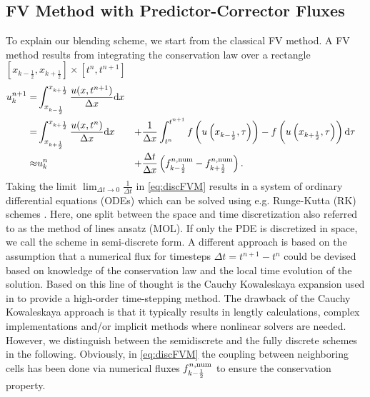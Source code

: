 \subsection{FV Method with Predictor-Corrector Fluxes}
To explain our blending scheme, we start from the classical FV method.  
A FV method results from integrating the conservation law over a rectangle $\left[x_{k-\frac 1 2}, x_{k + \frac 1 2}\right] \times \left[t^n, t^{n+1}\right]$
\begin{equation} \label{eq:discFVM}
\begin{aligned}
	 u^{n+1}_k =& \int_{x_{k-\frac 1 2}}^{x_{k+\frac 1 2}} \frac{u(x, t^{n+1})}{\Delta x} \mathrm{d} x \\=& \int_{x_{k+\frac 1 2}}^{x_{k+\frac 1 2}} \frac{u(x, t^n)}{\Delta x} \mathrm{d} x &+& \frac{1}{\Delta x}\int_{t^n}^{t^{n+1}} f\left(u\left(x_{k-\frac 1 2}, \tau\right)\right) - f\left(u\left(x_{k+\frac 1 2}, \tau \right)\right)  \mathrm{d} \tau \\
	  \approx&  u^{n}_k &+& \frac{\Delta t}{\Delta x} \left(f^{n, \mathrm{num}}_{k-\frac 1 2} - {f^{n, \mathrm{num}}_{k+\frac 1 2}}\right).
	 \end{aligned}
\end{equation}
Taking the limit $\lim_{\Delta t \to 0} \frac{1}{\Delta t}$ in \eqref{eq:discFVM} results in a system of ordinary differential equations (ODEs) which can be solved 
using e.g. Runge-Kutta (RK) schemes \cite{SO1988, SO1989}.  Here, one split between the space and time discretization also referred to as the method of lines ansatz (MOL). If only the PDE is discretized in space, we call the scheme in semi-discrete form.  
 A different approach is based on the assumption that a numerical flux for timesteps $\Delta t=t^{n+1}-t^n$ could be devised based on knowledge of the conservation law and the local time evolution of the solution. 
Based on this line of thought is the Cauchy Kowaleskaya expansion used in \cite{ENOIII} to provide a high-order time-stepping method.  
The drawback of the Cauchy Kowaleskaya approach is that it typically results in lengtly calculations, complex implementations and/or implicit methods where nonlinear solvers are needed. However, we distinguish between the semidiscrete and the fully discrete schemes in the following. 
Obviously, in  \eqref{eq:discFVM} the coupling between neighboring cells has been done via numerical fluxes $f^{n, \mathrm{num}}_{k-\frac 1 2}$ to ensure the conservation property. 
